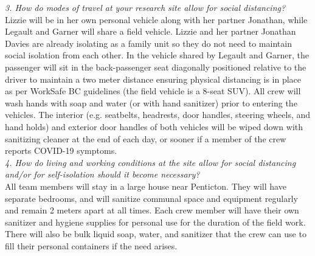 \documentclass[11pt,letter]{article}
\begin{document}
\emph{3. How do modes of travel at your research site allow for social distancing?}\\
Lizzie will be in her own personal vehicle along with her partner Jonathan, while Legault and Garner will share a field vehicle. Lizzie and her partner Jonathan Davies are already isolating as a family unit so they do not need to maintain social isolation from each other. In the vehicle shared by Legault and Garner, the passenger will sit in the back-passenger seat diagonally positioned relative to the driver to maintain a two meter distance ensuring physical distancing is in place as per WorkSafe BC guidelines (the field vehicle is a 8-seat SUV). All crew will wash hands with soap and water (or with hand sanitizer) prior to entering the vehicles. The interior (e.g. seatbelts, headrests, door handles, steering wheels, and hand holds) and exterior door handles of both vehicles will be wiped down with sanitizing cleaner at the end of each day, or sooner if a member of the crew reports COVID-19 symptoms.\\  

\emph{4. How do living and working conditions at the site allow for social distancing and/or for self-isolation should it become necessary?}\\
All team members will stay in a large house near Penticton. They will have separate bedrooms, and will sanitize communal space and equipment regularly and remain 2 meters apart at all times. Each crew member will have their own sanitizer and hygiene supplies for personal use for the duration of the field work. There will also be bulk liquid soap, water, and sanitizer that the crew can use to fill their personal containers if the need arises.\\
\end{document}
